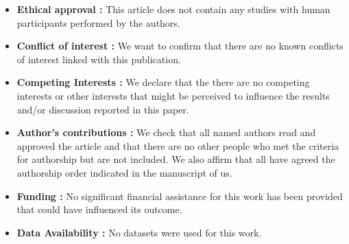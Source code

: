 \documentclass{sn-jnl}%
\begin{document}
\begin{itemize}
    \item []\textbf{Ethical approval :} This article does not contain any studies with human participants performed by the authors.

    \item[] \textbf{Conflict of interest :}  We want to confirm that there are no known conflicts of interest linked with this publication. 
    
\item[] \textbf{Competing Interests :} We declare that the there are no competing interests or other interests that might be perceived to influence the results and/or discussion reported in this paper.

\item[]\textbf{Author's contributions :}
We check that all named authors read and approved the article and that there are no other people who met the criteria for authorship but are not included. We also affirm that all have agreed the authorship order indicated in the manuscript of us.

\item[] \textbf{Funding :} No significant financial assistance for this work has been provided that could have influenced its outcome.

\item[] 
\textbf{Data Availability :} No datasets were used for this work.

    
\end{itemize}





% 
  
  

\end{document}
